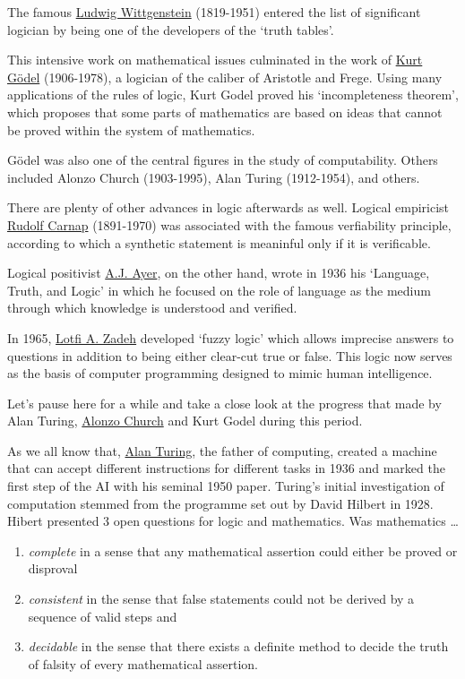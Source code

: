 \documentclass[]{book}
\theoremstyle{definition}
\theoremstyle{definition}
\theoremstyle{definition}
\theoremstyle{remark}
\begin{document}
The famous
\href{https://en.wikipedia.org/wiki/Ludwig_Wittgenstein}{Ludwig
Wittgenstein} (1819-1951) entered the list of significant logician by
being one of the developers of the `truth tables'.

This intensive work on mathematical issues culminated in the work of
\href{https://en.wikipedia.org/wiki/Kurt_G\%C3\%B6del}{Kurt Gödel}
(1906-1978), a logician of the caliber of Aristotle and Frege. Using
many applications of the rules of logic, Kurt Godel proved his
`incompleteness theorem', which proposes that some parts of mathematics
are based on ideas that cannot be proved within the system of
mathematics.

Gödel was also one of the central figures in the study of computability.
Others included Alonzo Church (1903-1995), Alan Turing (1912-1954), and
others.

There are plenty of other advances in logic afterwards as well. Logical
empiricist \href{https://en.wikipedia.org/wiki/Rudolf_Carnap}{Rudolf
Carnap} (1891-1970) was associated with the famous verfiability
principle, according to which a synthetic statement is meaninful only if
it is verificable.

Logical positivist \href{https://en.wikipedia.org/wiki/A._J._Ayer}{A.J.
Ayer}, on the other hand, wrote in 1936 his `Language, Truth, and Logic'
in which he focused on the role of language as the medium through which
knowledge is understood and verified.

In 1965, \href{https://en.wikipedia.org/wiki/Lotfi_A._Zadeh}{Lotfi A.
Zadeh} developed `fuzzy logic' which allows imprecise answers to
questions in addition to being either clear-cut true or false. This
logic now serves as the basis of computer programming designed to mimic
human intelligence.

Let's pause here for a while and take a close look at the progress that
made by Alan Turing,
\href{https://en.wikipedia.org/wiki/Alonzo_Church}{Alonzo Church} and
Kurt Godel during this period.

As we all know that,
\href{https://en.wikipedia.org/wiki/Alan_Turing}{Alan Turing}, the
father of computing, created a machine that can accept different
instructions for different tasks in 1936 and marked the first step of
the AI with his seminal 1950 paper. Turing's initial investigation of
computation stemmed from the programme set out by David Hilbert in 1928.
Hibert presented 3 open questions for logic and mathematics. Was
mathematics \ldots{}

\begin{enumerate}
\def\labelenumi{\arabic{enumi}.}
\item
  \emph{complete} in a sense that any mathematical assertion could
  either be proved or disproval
\item
  \emph{consistent} in the sense that false statements could not be
  derived by a sequence of valid steps and
\item
  \emph{decidable} in the sense that there exists a definite method to
  decide the truth of falsity of every mathematical assertion.
\end{enumerate}
\end{document}
